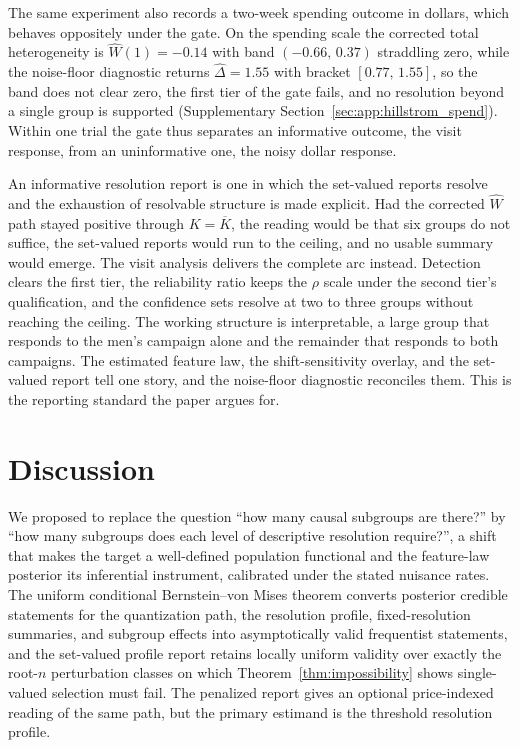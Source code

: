 \documentclass[11pt]{article}
\begin{document}
The same experiment also records a two-week spending outcome in dollars, which behaves oppositely under the gate. On the spending scale the corrected total heterogeneity is $\widehat W(1)=-0.14$ with band $(-0.66,\,0.37)$ straddling zero, while the noise-floor diagnostic returns $\widehat\Delta=1.55$ with bracket $[0.77,\,1.55]$, so the band does not clear zero, the first tier of the gate fails, and no resolution beyond a single group is supported (Supplementary Section~\ref{sec:app:hillstrom_spend}). Within one trial the gate thus separates an informative outcome, the visit response, from an uninformative one, the noisy dollar response.

An informative resolution report is one in which the set-valued reports resolve and the exhaustion of resolvable structure is made explicit. Had the corrected $\widehat W$ path stayed positive through $K=\overline K$, the reading would be that six groups do not suffice, the set-valued reports would run to the ceiling, and no usable summary would emerge. The visit analysis delivers the complete arc instead. Detection clears the first tier, the reliability ratio keeps the $\rho$ scale under the second tier's qualification, and the confidence sets resolve at two to three groups without reaching the ceiling. The working structure is interpretable, a large group that responds to the men's campaign alone and the remainder that responds to both campaigns. The estimated feature law, the shift-sensitivity overlay, and the set-valued report tell one story, and the noise-floor diagnostic reconciles them. This is the reporting standard the paper argues for.


\section{Discussion}\label{sec:discussion}

We proposed to replace the question ``how many causal subgroups are there?'' by ``how many subgroups does each level of descriptive resolution require?'', a shift that makes the target a well-defined population functional and the feature-law posterior its inferential instrument, calibrated under the stated nuisance rates. The uniform conditional Bernstein--von Mises theorem converts posterior credible statements for the quantization path, the resolution profile, fixed-resolution summaries, and subgroup effects into asymptotically valid frequentist statements, and the set-valued profile report retains locally uniform validity over exactly the root-$n$ perturbation classes on which Theorem~\ref{thm:impossibility} shows single-valued selection must fail. The penalized report gives an optional price-indexed reading of the same path, but the primary estimand is the threshold resolution profile.
\end{document}
